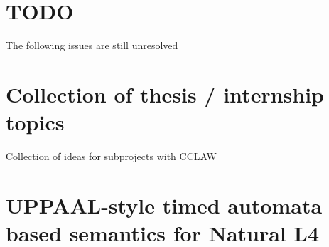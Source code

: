 
\section{TODO}

The following issues are still unresolved

\section{Collection of thesis / internship topics}

Collection of ideas for subprojects with CCLAW

\section{UPPAAL-style timed automata based semantics for Natural L4}


